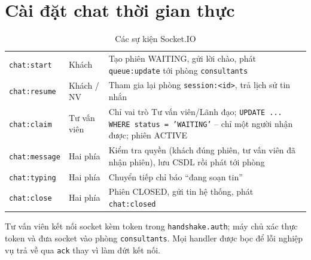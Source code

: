 \section{Cài đặt chat thời gian thực}
\begin{table}[H]\centering
\caption{Các sự kiện Socket.IO}\label{tab:events}
\begin{tabularx}{\linewidth}{|l|L{2.6cm}|Y|}
  \hline
  \headrow {} &  &  \\ \hline
  \texttt{chat:start} & Khách & Tạo phiên WAITING, gửi lời chào, phát \texttt{queue:update} tới phòng \texttt{consultants} \\ \hline
  \texttt{chat:resume} & Khách / NV & Tham gia lại phòng \texttt{session:<id>}, trả lịch sử tin nhắn \\ \hline
  \texttt{chat:claim} & Tư vấn viên & Chỉ vai trò Tư vấn viên/Lãnh đạo; \texttt{UPDATE ... WHERE status = 'WAITING'} – chỉ một người nhận được; phiên ACTIVE \\ \hline
  \texttt{chat:message} & Hai phía & Kiểm tra quyền (khách đúng phiên, tư vấn viên đã nhận phiên), lưu CSDL rồi phát tới phòng \\ \hline
  \texttt{chat:typing} & Hai phía & Chuyển tiếp chỉ báo “đang soạn tin” \\ \hline
  \texttt{chat:close} & Hai phía & Phiên CLOSED, gửi tin hệ thống, phát \texttt{chat:closed} \\ \hline
\end{tabularx}
\end{table}
Tư vấn viên kết nối socket kèm token trong \texttt{handshake.auth}; máy chủ xác thực token và đưa socket vào phòng \texttt{consultants}. Mọi handler được bọc để lỗi nghiệp vụ trả về qua \texttt{ack} thay vì làm đứt kết nối.


